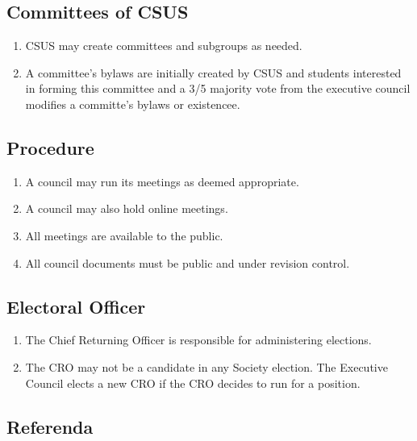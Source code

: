\subsection{Committees of CSUS}\label{committees-of-csus}

\begin{enumerate}
\def\labelenumi{\arabic{enumi}.}
\item
  CSUS may create committees and subgroups as needed.
\item
  A committee's bylaws are initially created by CSUS and students
  interested in forming this committee and a 3/5 majority vote from the
  executive council modifies a committe's bylaws or existencee.
\end{enumerate}

\subsection{Procedure}\label{procedure}

\begin{enumerate}
\def\labelenumi{\arabic{enumi}.}
\item
  A council may run its meetings as deemed appropriate.
\item
  A council may also hold online meetings.
\item
  All meetings are available to the public.
\item
  All council documents must be public and under revision control.
\end{enumerate}

\subsection{Electoral Officer}\label{electoral-officer}

\begin{enumerate}
\def\labelenumi{\arabic{enumi}.}
\item
  The Chief Returning Officer is responsible for administering
  elections.
\item
  The CRO may not be a candidate in any Society election. The Executive
  Council elects a new CRO if the CRO decides to run for a position.
\end{enumerate}

\subsection{Referenda}\label{referenda}


